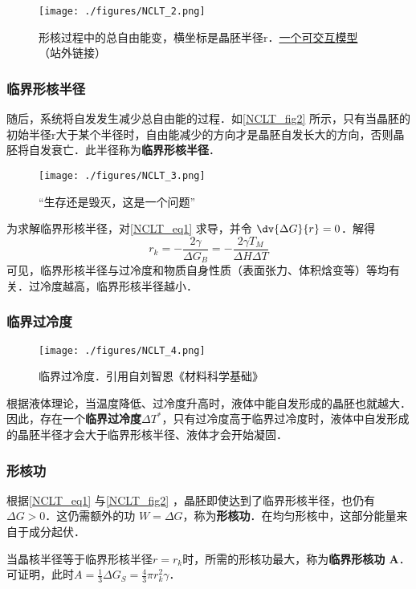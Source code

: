 \begin{figure}[ht]
\centering
\texttt{[image: ./figures/NCLT\_2.png]}
\caption{形核过程中的总自由能变，横坐标是晶胚半径r．\href{https://www.geogebra.org/m/prktxhhk}{一个可交互模型}（站外链接）} \label{NCLT_fig2}
\end{figure}

\subsubsection{临界形核半径}
随后，系统将自发发生减少总自由能的过程．如\autoref{NCLT_fig2} 所示，只有当晶胚的初始半径r大于某个半径时，自由能减少的方向才是晶胚自发长大的方向，否则晶胚将自发衰亡．此半径称为\textbf{临界形核半径}．
\begin{figure}[ht]
\centering
\texttt{[image: ./figures/NCLT\_3.png]}
\caption{“生存还是毁灭，这是一个问题”} \label{NCLT_fig3}
\end{figure}

为求解临界形核半径，对\autoref{NCLT_eq1} 求导，并令 $\dv{\Delta G}{r} = 0$．解得
\begin{equation}
r_k=-\frac{2\gamma}{\Delta G_B}=-\frac{2\gamma T_M}{\Delta H \Delta T}
\end{equation}
可见，临界形核半径与过冷度和物质自身性质（表面张力、体积焓变等）等均有关．过冷度越高，临界形核半径越小．

\subsubsection{临界过冷度}

\begin{figure}[ht]
\centering
\texttt{[image: ./figures/NCLT\_4.png]}
\caption{临界过冷度．引用自刘智恩《材料科学基础》} \label{NCLT_fig4}
\end{figure}
根据液体理论，当温度降低、过冷度升高时，液体中能自发形成的晶胚也就越大．因此，存在一个\textbf{临界过冷度$\Delta T^*$}，只有过冷度高于临界过冷度时，液体中自发形成的晶胚半径才会大于临界形核半径、液体才会开始凝固．

\subsubsection{形核功}
根据\autoref{NCLT_eq1} 与\autoref{NCLT_fig2} ，晶胚即使达到了临界形核半径，也仍有$\Delta G>0$．这仍需额外的功 $W=\Delta G$，称为\textbf{形核功}．在均匀形核中，这部分能量来自于成分起伏．

当晶核半径等于临界形核半径$r=r_k$时，所需的形核功最大，称为\textbf{临界形核功 A}．可证明，此时$A=\frac{1}{3}\Delta G_S=\frac{4}{3}\pi r_k^2 \gamma$．%

